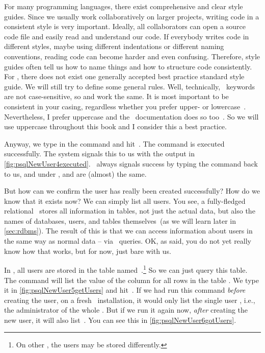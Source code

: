 %
For many programming languages, there exist comprehensive and clear style guides.
Since we usually work collaboratively on larger projects, writing code in a consistent style is very important.
Ideally, all collaborators can open a source code file and easily read and understand our code.
If everybody writes code in different styles, maybe using different indentations or different naming conventions, reading code can become harder and even confusing.
Therefore, style guides often tell us how to name things and how to structure code consistently.
For \sql, there does not exist one generally accepted best practice standard style guide.
We will still try to define some general rules.%
%
%
%
Well, technically, \sql\ keywords are not case-sensitive, so  and  work the same.
It is most important to be consistent in your casing, regardless whether you prefer upper- or lowercase~\cite{B2025DS:SBPASG}.
Nevertheless, I prefer uppercase and the \postgresql\ documentation does so too~\cite{PGDG:PD}.
So we will use uppercase throughout this book and I consider this a best practice.

Anyway, we type in the command and hit~\keys{\enter}.
The command is executed successfully.
The system signals this to us with the output  in \cref{fig:psqlNewUser4executed}.
\psql\ always signals success by typing the command back to us, and under \postgresql,  and  are (almost) the same.

But how can we confirm the user  has really been created successfully?
How do we know that it exists now?
We can simply list all users.
You see, a fully-fledged relational \dbms\ stores all information in tables, not just the actual data, but also the names of databases, users, and tables themselves~(as we will learn later in \cref{sec:rdbms}).
The result of this is that we can access information about users in the same way as normal data -- via \sql\ queries.
OK, as said, you do not yet really know how that works, but for now, just bare with us.

In \postgresql, all users are stored in the table named~.\footnote{%
On other , the users may be stored differently.}
So we can just query this table.
The \sql{} command  will list the value of the column  for all rows in the table .
We type it in \cref{fig:psqlNewUser5getUsers} and hit~\keys{\enter}.
If we had run this command \emph{before} creating the user, on a fresh \postgresql\ installation, it would only list the single user , i.e., the administrator of the whole \dbms.
But if we run it again now, \emph{after} creating the new user, it will also list~.
You can see this in \cref{fig:psqlNewUser6gotUsers}.

